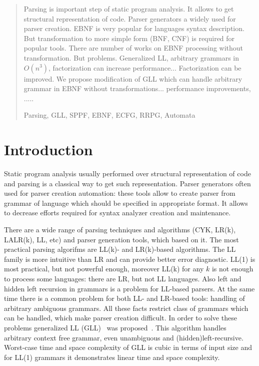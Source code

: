 \documentclass[runningheads,a4paper]{llncs}
\newcommand{\keywords}[1]{\par\addvspace\baselineskip
\noindent\keywordname\enspace\ignorespaces#1}
\begin{document}
\begin{abstract}


Parsing is important step of static program analysis. 
It allows to get structural representation of code.
Parser generators a widely used for parser creation. 
EBNF is very popular for languages syntax description.
But transformation to more simple form (BNF, CNF) is required for popular tools.
There are number of works on EBNF processing without transformation.
But problems.
Generalized LL, arbitrary grammars in $O(n^3)$, factorization can increase performance...
Factorization can be improved.
We propose modification of GLL which can handle arbitrary grammar in EBNF without transformations...
performance improvements, .....

\keywords{Parsing, GLL, SPPF, EBNF, ECFG, RRPG, Automata}
\end{abstract}


\section{Introduction}%

Static program analysis usually performed over structural representation of code and parsing is a classical way to get such representation.
Parser generators often used for parser creation automation: these tools allow to create parser from grammar of language which should be specified in appropriate format.
It allows to decrease efforts required for syntax analyzer creation and maintenance.

There are a wide range of parsing techniques and algorithms (CYK, LR(k), LALR(k), LL, etc) and parser generation tools, which based on it. 
The most practical parsing algorifms are LL(k)- and LR(k)-based algorithms.
The LL family is more intuitive than LR and can provide better error diagnostic.
LL(1) is most practical, but not powerful enough, moreover LL(k) for any $k$ is not enough to process some languages: there are LR, but not LL languages.
Also left and hidden left recursion in grammars is a problem for LL-based parsers.
At the same time there is a common problem for both LL- and LR-based tools: handling of arbitrary ambiguous grammars.
All these facts restrict class of grammars which can be handled, which make parser creation difficult. 
In order to solve these problems generalized LL (GLL)~\cite{scott2010gll} was proposed~\cite{scott2010gll}. 
This algorithm handles arbitrary context free grammar, even unambiguous and (hidden)left-recursive.
Worst-case time and space complexity of GLL is cubic in terms of input size and for LL(1) grammars it demonstrates linear time and space complexity.
\end{document}
